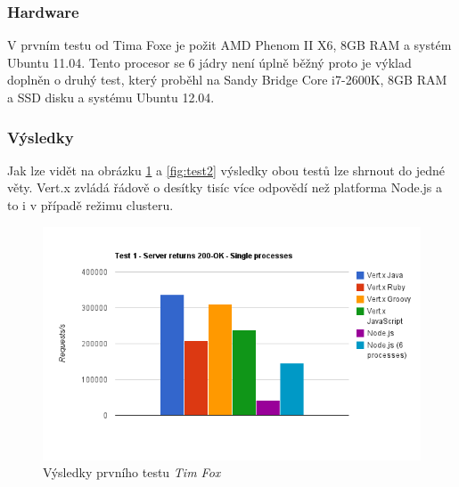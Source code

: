 \subsubsection{Hardware}

V prvním testu od Tima Foxe je požit  AMD Phenom II X6, 8GB RAM a systém Ubuntu 11.04. Tento procesor se 6 jádry není úplně běžný proto je výklad doplněn o druhý test, který proběhl na Sandy Bridge Core i7-2600K, 8GB RAM a SSD disku a systému Ubuntu 12.04.

\subsubsection{Výsledky}

Jak lze vidět na obrázku \ref{fig:test1} a \ref{fig:test2} výsledky obou testů lze shrnout do jedné věty. Vert.x zvládá řádově o desítky tisíc více odpovědí než platforma Node.js a to i v případě režimu clusteru.

\begin{figure}
\begin{centering}
\includegraphics[scale=0.7]{obrazky/chart_1}
\par\end{centering}
\caption{Výsledky prvního testu \emph{Tim Fox} \cite{benchmarkTim}\label{fig:test1}}
\end{figure}

